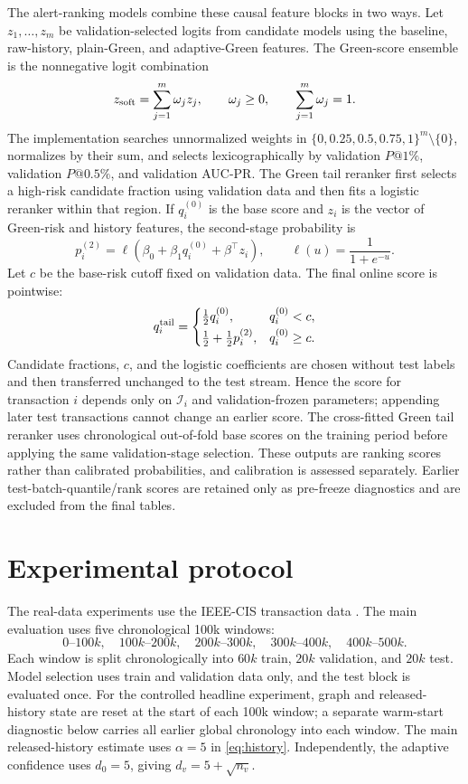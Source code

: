 \documentclass[11pt]{article}
\theoremstyle{definition}
\theoremstyle{remark}
\begin{document}
The alert-ranking models combine these causal feature blocks in two ways. Let $z_1,\ldots,z_m$ be validation-selected logits from candidate models using the baseline, raw-history, plain-Green, and adaptive-Green features. The Green-score ensemble is the nonnegative logit combination
\[
    z_{\rm soft}=\sum_{j=1}^m\omega_j z_j,
    \qquad \omega_j\ge0,
    \qquad \sum_{j=1}^m\omega_j=1.
\]
The implementation searches unnormalized weights in $\{0,0.25,0.5,0.75,1\}^m\setminus\{0\}$, normalizes by their sum, and selects lexicographically by validation $P@1\%$, validation $P@0.5\%$, and validation AUC-PR. The Green tail reranker first selects a high-risk candidate fraction using validation data and then fits a logistic reranker within that region. If $q_i^{(0)}$ is the base score and $z_i$ is the vector of Green-risk and history features, the second-stage probability is
\[
    p_i^{(2)}=\ell\!\left(\beta_0+\beta_1q_i^{(0)}+\beta^\top z_i\right),
    \qquad
    \ell(u)=\frac{1}{1+e^{-u}}.
\]
Let $c$ be the base-risk cutoff fixed on validation data. The final online score is pointwise:
\[
 q_i^{\rm tail}=
 \begin{cases}
 \tfrac12 q_i^{(0)}, & q_i^{(0)}<c,\\[2pt]
 \tfrac12+\tfrac12p_i^{(2)}, & q_i^{(0)}\ge c.
 \end{cases}
\]
Candidate fractions, $c$, and the logistic coefficients are chosen without test labels and then transferred unchanged to the test stream. Hence the score for transaction $i$ depends only on $\mathcal I_i$ and validation-frozen parameters; appending later test transactions cannot change an earlier score. The cross-fitted Green tail reranker uses chronological out-of-fold base scores on the training period before applying the same validation-stage selection. These outputs are ranking scores rather than calibrated probabilities, and calibration is assessed separately. Earlier test-batch-quantile/rank scores are retained only as pre-freeze diagnostics and are excluded from the final tables.

\section{Experimental protocol}
\label{sec:protocol}

The real-data experiments use the IEEE-CIS transaction data \cite{ieeecis}. The main evaluation uses five chronological 100k windows:
\[
    0\text{--}100k,
    \quad 100k\text{--}200k,
    \quad 200k\text{--}300k,
    \quad 300k\text{--}400k,
    \quad 400k\text{--}500k.
\]
Each window is split chronologically into $60k$ train, $20k$ validation, and $20k$ test. Model selection uses train and validation data only, and the test block is evaluated once. For the controlled headline experiment, graph and released-history state are reset at the start of each 100k window; a separate warm-start diagnostic below carries all earlier global chronology into each window. The main released-history estimate uses $\alpha=5$ in \eqref{eq:history}. Independently, the adaptive confidence uses $d_0=5$, giving $d_v=5+\sqrt{n_v}$.
\end{document}
